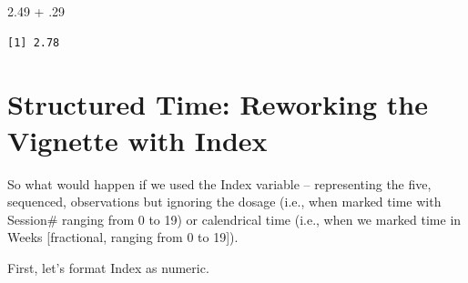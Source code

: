 \documentclass[
  english,
]{book}
\newenvironment{Shaded}{\begin{snugshade}}{\end{snugshade}}
\newcommand{\AttributeTok}[1]{\textcolor[rgb]{0.77,0.63,0.00}{#1}}
\newcommand{\DecValTok}[1]{\textcolor[rgb]{0.00,0.00,0.81}{#1}}
\newcommand{\FloatTok}[1]{\textcolor[rgb]{0.00,0.00,0.81}{#1}}
\newcommand{\FunctionTok}[1]{\textcolor[rgb]{0.00,0.00,0.00}{#1}}
\newcommand{\NormalTok}[1]{#1}
\newcommand{\OtherTok}[1]{\textcolor[rgb]{0.56,0.35,0.01}{#1}}
\newcommand{\SpecialCharTok}[1]{\textcolor[rgb]{0.00,0.00,0.00}{#1}}
\begin{document}
\begin{Shaded}
\begin{Highlighting}[]
\FloatTok{2.49} \SpecialCharTok{+}\NormalTok{ .}\DecValTok{29}
\end{Highlighting}
\end{Shaded}

\begin{verbatim}
[1] 2.78
\end{verbatim}

\hypertarget{structured-time-reworking-the-vignette-with-index}{%
\section{Structured Time: Reworking the Vignette with Index}\label{structured-time-reworking-the-vignette-with-index}}

So what would happen if we used the Index variable -- representing the five, sequenced, observations but ignoring the dosage (i.e., when marked time with Session\# ranging from 0 to 19) or calendrical time (i.e., when we marked time in Weeks {[}fractional, ranging from 0 to 19{]}).

First, let's format Index as numeric.

\begin{Shaded}
\end{Shaded}
\end{document}

